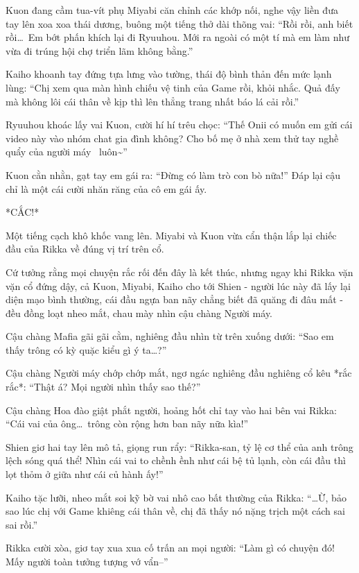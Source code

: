 \documentclass[../main.tex]{subfiles}
\begin{document}
Kuon đang cầm tua-vít phụ Miyabi căn chỉnh các khớp nối, nghe vậy liền đưa tay lên xoa xoa thái dương, buông một tiếng thở dài thõng vai: ``Rồi rồi, anh biết rồi\dots\ Em bớt phấn khích lại đi Ryuuhou. Mới ra ngoài có một tí mà em làm như vừa đi trúng hội chợ triển lãm không bằng.''

Kaiho khoanh tay đứng tựa lưng vào tường, thái độ bình thản đến mức lạnh lùng: ``Chị xem qua màn hình chiếu vệ tinh của Game rồi, khỏi nhắc. Quả đấy mà không lôi cái thân về kịp thì lên thẳng trang nhất báo lá cải rồi.''

Ryuuhou khoác lấy vai Kuon, cười hí hí trêu chọc: ``Thế Onii có muốn em gửi cái video này vào nhóm chat gia đình không? Cho bố mẹ ở nhà xem thử tay nghề quẩy của người máy \hls\ luôn\~{}''

Kuon cằn nhằn, gạt tay em gái ra: ``Đừng có làm trò con bò nữa!'' Đáp lại cậu chỉ là một cái cười nhăn răng của cô em gái ấy.

*CẮC!*

Một tiếng cạch khô khốc vang lên. Miyabi và Kuon vừa cẩn thận lắp lại chiếc đầu của Rikka về đúng vị trí trên cổ.

Cứ tưởng rằng mọi chuyện rắc rối đến đây là kết thúc, nhưng ngay khi Rikka vặn vặn cổ đứng dậy, cả Kuon, Miyabi, Kaiho cho tới Shien - người lúc này đã lấy lại diện mạo bình thường, cái đầu ngựa ban nãy chẳng biết đã quăng đi đâu mất - đều đồng loạt nheo mắt, chau mày nhìn cậu chàng Người máy.

Cậu chàng Mafia gãi gãi cằm, nghiêng đầu nhìn từ trên xuống dưới: ``Sao em thấy trông có kỳ quặc kiểu gì ý ta\dots?''

Cậu chàng Người máy chớp chớp mắt, ngơ ngác nghiêng đầu nghiêng cổ kêu *rắc rắc*: ``Thật á? Mọi người nhìn thấy sao thế?''

Cậu chàng Hoa đào giật phắt người, hoảng hốt chỉ tay vào hai bên vai Rikka: ``Cái vai của ông\dots\ trông còn rộng hơn ban nãy nữa kìa!''

Shien giơ hai tay lên mô tả, giọng run rẩy: ``Rikka-san, tỷ lệ cơ thể của anh trông lệch sóng quá thể! Nhìn cái vai to chềnh ềnh như cái bệ tủ lạnh, còn cái đầu thì lọt thỏm ở giữa như cái củ hành ấy!''

Kaiho tặc lưỡi, nheo mắt soi kỹ bờ vai nhô cao bất thường của Rikka: ``\dots Ừ, bảo sao lúc chị với Game khiêng cái thân về, chị đã thấy nó nặng trịch một cách sai sai rồi.''

Rikka cười xòa, giơ tay xua xua cố trấn an mọi người: ``Làm gì có chuyện đó! Mấy người toàn tưởng tượng vớ vẩn--''
\end{document}
